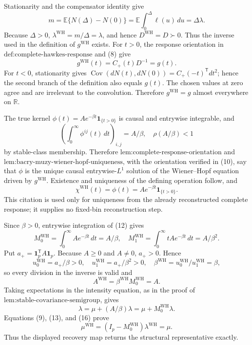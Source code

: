Stationarity and the compensator identity give
\[
 m=\mathbb E\{N(\Delta)-N(0)\}
 =\mathbb E\int_0^\Delta\ell(u)\,du=\Delta\lambda.
\tag{9}
\]
Because \(\Delta>0\), \(\lambda^{\mathrm{WH}}=m/\Delta=\lambda\), and hence \(D^{\mathrm{WH}}=D\succ0\).  Thus the inverse used in the definition of \(g^{\mathrm{WH}}\) exists.  For \(t>0\), the response orientation in \(\text{def:complete-hawkes-response}\) and (8) give
\[
 g^{\mathrm{WH}}(t)=C_{+}(t)D^{-1}=g(t).
\tag{10}
\]
For \(t<0\), stationarity gives
\(\operatorname{Cov}(dN(t),dN(0))=C_{+}(-t)^{\mathsf T}dt^2\); hence the second branch of the definition also equals \(g(t)\).  The chosen values at zero agree and are irrelevant to the convolution.  Therefore \(g^{\mathrm{WH}}=g\) almost everywhere on \(\mathbb R\).

The true kernel \(\phi(t)=Ae^{-\beta t}\mathbf 1_{\{t>0\}}\) is causal and entrywise integrable, and
\[
 \left(\int_0^\infty\phi^{ij}(t)\,dt\right)_{i,j}=A/\beta,\quad
 \rho(A/\beta)<1
\tag{11}
\]
by stable-class membership.  Therefore \(\text{lem:complete-response-orientation}\) and \(\text{lem:bacry-muzy-wiener-hopf-uniqueness}\), with the orientation verified in (10), say that \(\phi\) is the unique causal entrywise-\(L^1\) solution of the Wiener--Hopf equation driven by \(g^{\mathrm{WH}}\).  Existence and uniqueness of the defining operation follow, and
\[
 \chi^{\mathrm{WH}}(t)=\phi(t)=Ae^{-\beta t}\mathbf 1_{\{t>0\}}.
\tag{12}
\]
This citation is used only for uniqueness from the already reconstructed complete response; it supplies no fixed-bin reconstruction step.

Since \(\beta>0\), entrywise integration of (12) gives
\[
 M_0^{\mathrm{WH}}=\int_0^\infty Ae^{-\beta t}\,dt=A/\beta,\quad
 M_1^{\mathrm{WH}}=\int_0^\infty tAe^{-\beta t}\,dt=A/\beta^2.
\tag{13}
\]
Put \(a_+=\mathbf 1_p^{\mathsf T}A\mathbf 1_p\).  Because \(A\geq0\) and \(A\neq0\), \(a_+>0\).  Hence
\[
 u_0^{\mathrm{WH}}=a_+/\beta>0,\quad
 u_1^{\mathrm{WH}}=a_+/\beta^2>0,\quad
 \beta^{\mathrm{WH}}=u_0^{\mathrm{WH}}/u_1^{\mathrm{WH}}=\beta,
\tag{14}
\]
so every division in the inverse is valid and
\[
 A^{\mathrm{WH}}=\beta^{\mathrm{WH}}M_0^{\mathrm{WH}}=A.
\tag{15}
\]
Taking expectations in the intensity equation, as in the proof of \(\text{lem:stable-covariance-semigroup}\), gives
\[
 \lambda=\mu+(A/\beta)\lambda=\mu+M_0^{\mathrm{WH}}\lambda.
\tag{16}
\]
Equations (9), (13), and (16) prove
\[
 \mu^{\mathrm{WH}}=(I_p-M_0^{\mathrm{WH}})\lambda^{\mathrm{WH}}=\mu.
\tag{17}
\]
Thus the displayed recovery map returns the structural representative exactly.

